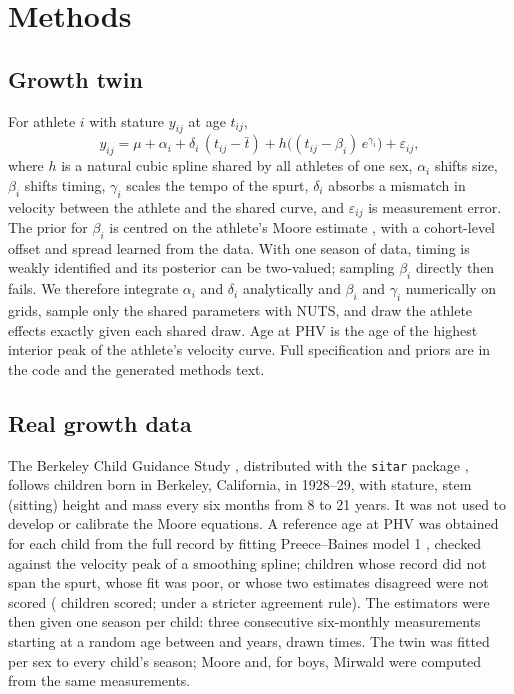 \documentclass[journal]{IEEEtran}
\begin{document}
\section{Methods}

\subsection{Growth twin}
For athlete $i$ with stature $y_{ij}$ at age $t_{ij}$,
\begin{equation}
y_{ij} = \mu + \alpha_i + \delta_i \,(t_{ij} - \bar t) + h\!\big((t_{ij}-\beta_i)\,e^{\gamma_i}\big) + \varepsilon_{ij},
\end{equation}
where $h$ is a natural cubic spline shared by all athletes of one sex, $\alpha_i$ shifts size,
$\beta_i$ shifts timing, $\gamma_i$ scales the tempo of the spurt, $\delta_i$ absorbs a mismatch
in velocity between the athlete and the shared curve, and $\varepsilon_{ij}$ is measurement
error. The prior for $\beta_i$ is centred on the athlete's Moore estimate \cite{moore2015},
with a cohort-level offset and spread learned from the data. With one season of data, timing
is weakly identified and its posterior can be two-valued; sampling $\beta_i$ directly then
fails. We therefore integrate $\alpha_i$ and $\delta_i$ analytically and $\beta_i$ and
$\gamma_i$ numerically on grids, sample only the shared parameters with NUTS, and draw the
athlete effects exactly given each shared draw. Age at PHV is the age of the highest interior
peak of the athlete's velocity curve. Full specification and priors are in the code and the
generated methods text.

\subsection{Real growth data}
The Berkeley Child Guidance Study \cite{tuddenham1954}, distributed with the \texttt{sitar}
package \cite{sitarpkg}, follows \BerkChildren{} children born in Berkeley, California, in
1928--29, with stature, stem (sitting) height and mass every six months from 8 to 21 years.
It was not used to develop or calibrate the Moore equations. A reference age at PHV was
obtained for each child from the full record by fitting Preece--Baines model 1
\cite{preece1978}, checked against the velocity peak of a smoothing spline; children whose
record did not span the spurt, whose fit was poor, or whose two estimates disagreed were not
scored (\BerkIncluded{} children scored; \BerkStrict{} under a stricter agreement rule). The
estimators were then given one season per child: three consecutive six-monthly measurements
starting at a random age between \SpecWindowLow{} and \SpecWindowHigh{} years, drawn \BerkReplicates{} times. The twin was
fitted per sex to every child's season; Moore \cite{moore2015} and, for boys, Mirwald
\cite{mirwald2002} were computed from the same measurements.
\end{document}
